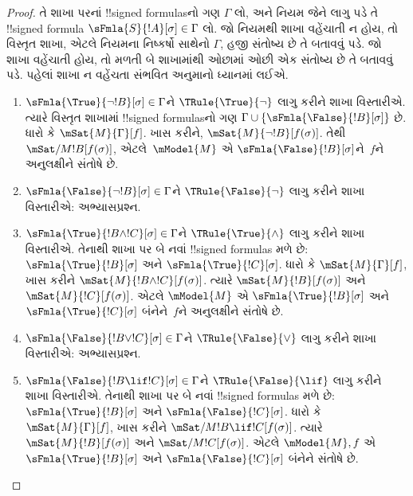 \documentclass[../../../include/open-logic-section]{subfiles}
\begin{document}
\begin{proof}
તે શાખા પરનાં !!{signed formula}sનો ગણ $\Gamma$ લો, અને નિયમ
જેને લાગુ પડે તે !!{signed formula}
$\sFmla{S}{!A}[\sigma] \in \Gamma$ લો. જો નિયમથી શાખા
વહેંચાતી ન હોય, તો વિસ્તૃત શાખા, એટલે નિયમના નિષ્કર્ષો સાથેનો
$\Gamma$, હજી સંતોષ્ય છે તે બતાવવું પડે. જો શાખા વહેંચાતી
હોય, તો મળતી બે શાખામાંથી ઓછામાં ઓછી એક સંતોષ્ય છે તે બતાવવું
પડે.
પહેલાં શાખા ન વહેંચતા સંભવિત અનુમાનો ધ્યાનમાં લઈએ.
\begin{enumerate}
\item $\sFmla{\True}{\lnot !B}[\sigma] \in \Gamma$ને
  $\TRule{\True}{\lnot}$ લાગુ કરીને શાખા વિસ્તારીએ. ત્યારે
  વિસ્તૃત શાખામાં !!{signed formula}sનો ગણ $\Gamma \cup
  \{\sFmla{\False}{!B}[\sigma]\}$ છે. ધારો કે
  $\mSat{M}{\Gamma}[f]$. ખાસ કરીને,
  $\mSat{M}{\lnot !B}[f(\sigma)]$. તેથી
  $\mSat/{M}{!B}[f(\sigma)]$, એટલે~$\mModel{M}$ એ
  $\sFmla{\False}{!B}[\sigma]$ને~$f$ને અનુલક્ષીને સંતોષે છે.
\item $\sFmla{\False}{\lnot !B}[\sigma] \in \Gamma$ને
  $\TRule{\False}{\lnot}$ લાગુ કરીને શાખા વિસ્તારીએ:
  અભ્યાસપ્રશ્ન.
\item $\sFmla{\True}{!B \land !C}[\sigma] \in \Gamma$ને
  $\TRule{\True}{\land}$ લાગુ કરીને શાખા વિસ્તારીએ. તેનાથી
  શાખા પર બે નવાં !!{signed formula}s મળે છે:
  $\sFmla{\True}{!B}[\sigma]$ અને $\sFmla{\True}{!C}[\sigma]$.
  ધારો કે $\mSat{M}{\Gamma}[f]$, ખાસ કરીને
  $\mSat{M}{!B \land !C}[f(\sigma)]$. ત્યારે
  $\mSat{M}{!B}[f(\sigma)]$ અને $\mSat{M}{!C}[f(\sigma)]$.
  એટલે $\mModel{M}$ એ $\sFmla{\True}{!B}[\sigma]$ અને
  $\sFmla{\True}{!C}[\sigma]$ બંનેને~$f$ને અનુલક્ષીને સંતોષે છે.
\item $\sFmla{\False}{!B \lor !C}[\sigma] \in \Gamma$ને
  $\TRule{\False}{\lor}$ લાગુ કરીને શાખા વિસ્તારીએ:
  અભ્યાસપ્રશ્ન.
\item $\sFmla{\False}{!B \lif !C}[\sigma] \in \Gamma$ને
  $\TRule{\False}{\lif}$ લાગુ કરીને શાખા વિસ્તારીએ. તેનાથી
  શાખા પર બે નવાં !!{signed formula}s મળે છે:
  $\sFmla{\True}{!B}[\sigma]$ અને
  $\sFmla{\False}{!C}[\sigma]$. ધારો કે
  $\mSat{M}{\Gamma}[f]$, ખાસ કરીને
  $\mSat/{M}{!B \lif !C}[f(\sigma)]$. ત્યારે
  $\mSat{M}{!B}[f(\sigma)]$ અને
  $\mSat/{M}{!C}[f(\sigma)]$. એટલે
  $\mModel{M}, f$ એ $\sFmla{\True}{!B}[\sigma]$ અને
  $\sFmla{\False}{!C}[\sigma]$ બંનેને સંતોષે છે.


\end{enumerate}
\end{proof}
\end{document}
